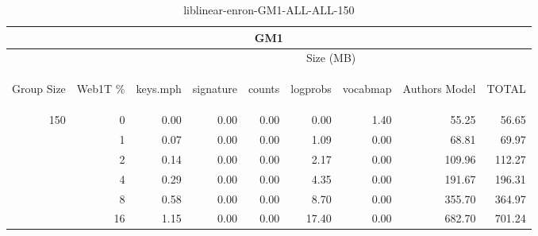 \begin{center}
\begin{table}[htbp]
\begin{tabular}{ | r | r | r | r | r | r | r | r | r |}
\hline
\multicolumn{9}{|c|}{GM1}\\
\hline
 & & \multicolumn{7}{|c|}{Size (MB)}\\ \cline{3-9}
\begin{sideways}Group Size\end{sideways} & \begin{sideways}Web1T \% \end{sideways} & \begin{sideways}keys.mph\end{sideways} & \begin{sideways}signature\end{sideways} & \begin{sideways}counts\end{sideways} & \begin{sideways}logprobs\end{sideways} & \begin{sideways}vocabmap\end{sideways} & \begin{sideways}Authors Model \end{sideways} & \begin{sideways}TOTAL\end{sideways}\\
\hline
\multirow{5}{*}{150}
 & 0 & 0.00 & 0.00 & 0.00 & 0.00 & 1.40 & 55.25 & 56.65\\ \cline{2-9}
 & 1 & 0.07 & 0.00 & 0.00 & 1.09 & 0.00 & 68.81 & 69.97\\ \cline{2-9}
 & 2 & 0.14 & 0.00 & 0.00 & 2.17 & 0.00 & 109.96 & 112.27\\ \cline{2-9}
 & 4 & 0.29 & 0.00 & 0.00 & 4.35 & 0.00 & 191.67 & 196.31\\ \cline{2-9}
 & 8 & 0.58 & 0.00 & 0.00 & 8.70 & 0.00 & 355.70 & 364.97\\ \cline{2-9}
 & 16 & 1.15 & 0.00 & 0.00 & 17.40 & 0.00 & 682.70 & 701.24\\ \cline{2-9}
\hline
\end{tabular}
\caption{liblinear-enron-GM1-ALL-ALL-150}
\label{table:liblinear-enron-GM1-ALL-ALL-150}
\end{table}
\end{center}

